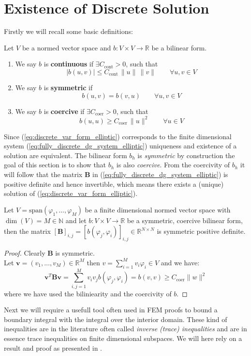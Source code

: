 \section{Existence of Discrete Solution}
\label{sec:existence_uniqueness_elliptic_discrete_problem}
Firstly we will recall some basic definitions:
\begin{definition} Let $V$ be a normed vector space and $b:V\times V \to \mathbb{R}$
    be a bilinear form.
    \begin{enumerate}[label=\textnormal{(\roman*)}]
        \item We say $b$ is \textbf{continuous} if $\exists C_{\text{cont}}>0$, such that
        \[
            |b(u,v)|\leq C_{\text{cont}}\, \|u\|\, \|v\| \qquad \forall u,v \in V
        \]
        \item We say $b$ is \textbf{symmetric} if 
        \[  
            b(u,v) = b(v,u) \qquad \forall u,v \in V
        \]
        \item We say $b$ is \textbf{coercive} if $\exists C_{\text{coer}}>0$, such that
        \[
            b(u,u)\geq C_{\text{coer}}\, \|u\|^2 \qquad \forall u \in V
        \]
    \end{enumerate}
\end{definition}


Since (\ref{eq:discrete_var_form_elliptic}) corresponds to the finite dimensional
system (\ref{eq:fully_discrete_dg_system_elliptic}) uniqueness and existence of a solution
are equivalent. 
The bilinear form $b_h$ is \textit{symmetric} by construction 
the goal of this section is to show that $b_h$ is also \textit{coercive}. 
From the coercivity of $b_h$ it will follow that the matrix $\textbf{B}$ in (\ref{eq:fully_discrete_dg_system_elliptic})
is positive definite and hence invertible, which means there exists a (unique) solution
of (\ref{eq:discrete_var_form_elliptic}).
\begin{lemma}
    Let $V = \text{span}(\varphi_1,\ldots,\varphi_M)$ be a finite dimensional 
    normed vector space with $\dim(V) = M\in \mathbb{N}$ and let
    $b:V \times V \to \mathbb{R}$ be a symmetric, coercive bilinear form,
    then the matrix ${[\textbf{B}]}_{i,j} = {[b(\varphi_j, \varphi_i)]}_{i,j}\in \mathbb{R}^{N\times N}$
    is symmetric positive definite.
\end{lemma}
\begin{proof}
    Clearly $\textbf{B}$ is symmetric. \\
    Let $\textbf{v}=(v_1,\ldots,v_M)\in \mathbb{R}^M$ then $v = \sum_{i=1}^{M}
    v_i \varphi_i\in V$ and we have:
    \[
        \textbf{v}^{T}\textbf{B}\textbf{v} = \sum_{i,j=1}^{M}v_i v_j b(\varphi_j,\varphi_i) = b(v,v) \geq
        C_{\text{coer}} \|w\|^2
    \]
    where we have used the biliniearity and the coercivity of $b$.
\end{proof}
Next we will require a usefull tool often used in FEM proofs to bound
a boundary integral with the integral over the interior domain. These kind
of inequalities are in the literature often called \textit{inverse (trace) inequalities}
and are in essence trace inequalities on finite dimensional subspaces.
We will here rely on a result and proof as presented in \cite{warburtonHesthaven2003ineq}.

